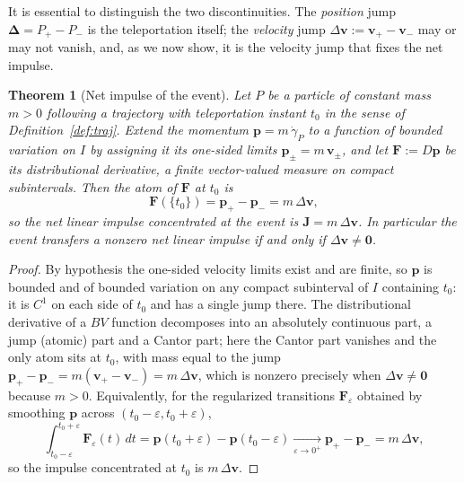 \documentclass[10pt,a4paper]{amsart}
\newtheorem{theorem}[definition]{Theorem}
\begin{document}
	It is essential to distinguish the two discontinuities. The
	\emph{position} jump $\boldsymbol\Delta=P_{+}-P_{-}$ is the
	teleportation itself; the \emph{velocity} jump
	$\Delta\mathbf v:=\mathbf v_{+}-\mathbf v_{-}$ may or may not vanish,
	and, as we now show, it is the velocity jump that fixes the net
	impulse.
	

	\begin{theorem}[Net impulse of the event]
		\label{thm:impulse}
		Let $P$ be a particle of constant mass $m>0$ following a trajectory
		with teleportation instant $t_0$ in the sense of
		Definition~\ref{def:traj}. Extend the momentum
		$\mathbf p=m\,\dot\gamma_P$ to a function of bounded variation on
		$I$ by assigning it its one-sided limits $\mathbf p_{\pm}=m\,
		\mathbf v_{\pm}$, and let $\mathbf F:=D\mathbf p$ be its
		distributional derivative, a finite vector-valued measure on
		compact subintervals. Then the atom of $\mathbf F$ at $t_0$ is
		\[
		\mathbf F(\{t_0\})=\mathbf p_{+}-\mathbf p_{-}=m\,\Delta\mathbf v,
		\]
		so the net linear impulse concentrated at the event is
		$\mathbf J=m\,\Delta\mathbf v$. In particular the event transfers a
		nonzero net linear impulse if and only if $\Delta\mathbf v\neq
		\mathbf 0$.
	\end{theorem}

	\begin{proof}
		By hypothesis the one-sided velocity limits exist and are finite, so
		$\mathbf p$ is bounded and of bounded variation on any compact
		subinterval of $I$ containing $t_0$: it is $C^{1}$ on each side of
		$t_0$ and has a single jump there. The distributional derivative of
		a $BV$ function decomposes into an absolutely continuous part, a
		jump (atomic) part and a Cantor part; here the Cantor part vanishes
		and the only atom sits at $t_0$, with mass equal to the jump
		$\mathbf p_{+}-\mathbf p_{-}=m(\mathbf v_{+}-\mathbf v_{-})
		=m\,\Delta\mathbf v$, which is nonzero precisely when
		$\Delta\mathbf v\neq\mathbf 0$ because $m>0$. Equivalently, for the
		regularized transitions $\mathbf F_\varepsilon$ obtained by
		smoothing $\mathbf p$ across $(t_0-\varepsilon,t_0+\varepsilon)$,
		\[
		\int_{t_0-\varepsilon}^{t_0+\varepsilon}\mathbf F_\varepsilon(t)\,dt
		=\mathbf p(t_0+\varepsilon)-\mathbf p(t_0-\varepsilon)
		\xrightarrow[\varepsilon\to0^{+}]{}
		\mathbf p_{+}-\mathbf p_{-}=m\,\Delta\mathbf v,
		\]
		so the impulse concentrated at $t_0$ is $m\,\Delta\mathbf v$.
	\end{proof}
	
\end{document}
